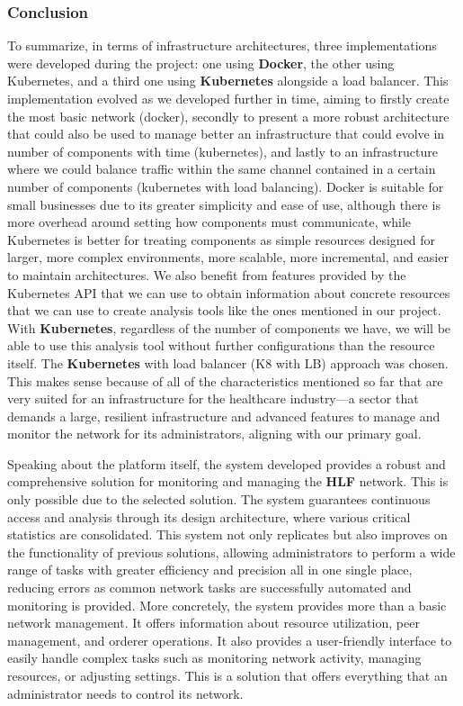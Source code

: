 \subsubsection{Conclusion}
To summarize, in terms of infrastructure architectures, three implementations were developed during the project: one using \textbf{Docker}, the other using Kubernetes, and a third one using \textbf{Kubernetes} alongside a load balancer. This implementation evolved as we developed further in time, aiming to firstly create the most basic network (docker), secondly to present a more robust architecture that could also be used to manage better an infrastructure that could evolve in number of components with time (kubernetes), and lastly to an infrastructure where we could balance traffic within the same channel contained in a certain number of components (kubernetes with load balancing). Docker is suitable for small businesses due to its greater simplicity and ease of use, although there is more overhead around setting how components must communicate, while Kubernetes is better for treating components as simple resources designed for larger, more complex environments, more scalable, more incremental, and easier to maintain architectures. We also benefit from features provided by the Kubernetes API that we can use to obtain information about concrete resources that we can use to create analysis tools like the ones mentioned in our project. With \textbf{Kubernetes}, regardless of the number of components we have, we will be able to use this analysis tool without further configurations than the resource itself. The \textbf{Kubernetes} with load balancer (K8 with LB) approach was chosen. This makes sense because of all of the characteristics mentioned so far that are very suited for an infrastructure for the healthcare industry—a sector that demands a large, resilient infrastructure and advanced features to manage and monitor the network for its administrators, aligning with our primary goal.

Speaking about the platform itself, the system developed provides a robust and comprehensive solution for monitoring and managing the \textbf{HLF} network. This is only possible due to the selected solution. The system guarantees continuous access and analysis through its design architecture, where various critical statistics are consolidated. This system not only replicates but also improves on the functionality of previous solutions, allowing administrators to perform a wide range of tasks with greater efficiency and precision all in one single place, reducing errors as common network tasks are successfully automated and monitoring is provided. More concretely, the system provides more than a basic network management. It offers information about resource utilization, peer management, and orderer operations. It also provides a user-friendly interface to easily handle complex tasks such as monitoring network activity, managing resources, or adjusting settings. This is a solution that offers everything that an administrator needs to control its network.